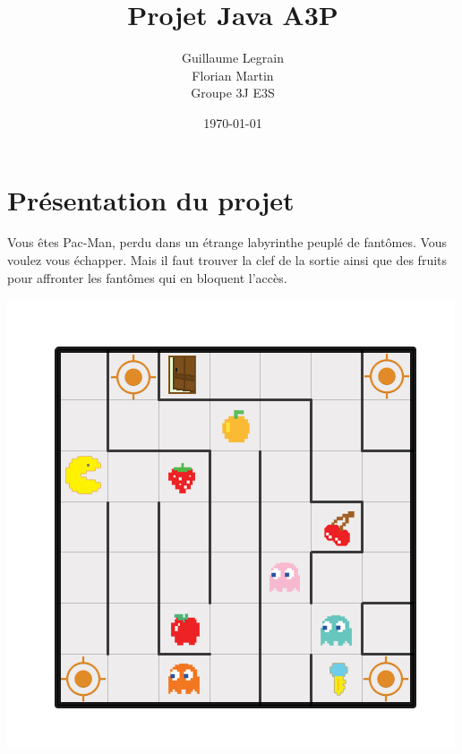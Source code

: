 \documentclass[twoside,french]{report}
\begin{document}
\begin{titlepage}

\title{Projet Java A3P}
\date{\today}
\author{Guillaume Legrain \\
        Florian Martin \\
        Groupe 3J E3S}
\maketitle
\end{titlepage}

\tableofcontents

\chapter{Présentation du projet}
Vous êtes Pac-Man, perdu dans un étrange labyrinthe peuplé de fantômes. Vous voulez vous échapper.
Mais il faut trouver la clef de la sortie ainsi que des fruits pour affronter les fantômes qui en
bloquent l’accès.

\includegraphics[scale=0.8]{graphics/Plan-Projet-1.png}
\end{document}
